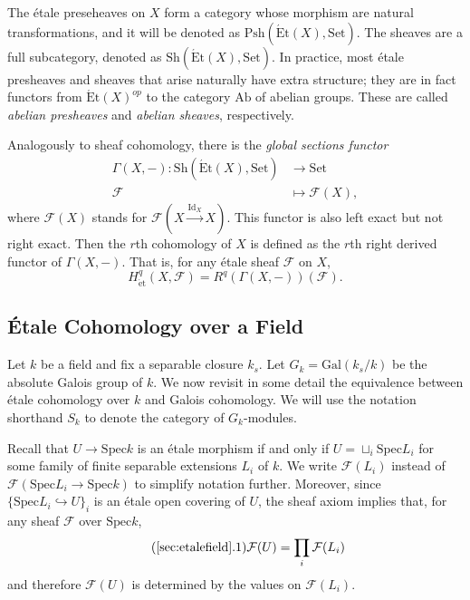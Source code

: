 \documentclass{article}
\newcommand{\Spec}{\mathrm{Spec}}
\newcommand{\Gal}{\mathrm{Gal}}
\newcommand{\Ab}{\mathrm{Ab}}
\newcommand{\Set}{\mathrm{Set}}
\newcommand{\Et}{\acute{\mathrm{E}}\mathrm{t}}
\newcommand{\et}{\acute{\mathrm{e}}\mathrm{t}}
\newcommand{\Psh}{\mathrm{Psh}}
\newcommand{\Sh}{\mathrm{Sh}}
\newcommand{\Id}{\mathrm{Id}}
\theoremstyle{plain}
\theoremstyle{definition}
\begin{document}
    The \'{e}tale preseheaves on $X$ form a category whose morphism are natural transformations, and it will be denoted as $\Psh(\Et(X),\Set)$. The sheaves are a full subcategory, denoted as $\Sh(\Et(X),\Set)$. In practice, most \'{e}tale presheaves and sheaves that arise naturally have extra structure; they are in fact functors from $\Et(X)^{op}$ to the category $\Ab$ of abelian groups. These are called \textit{abelian presheaves} and \textit{abelian sheaves}, respectively.    
    
    Analogously to sheaf cohomology, there is the \textit{global sections functor}
    \begin{align*}
        \Gamma(X,-):\mathrm{Sh}(\Et(X),\Set)&\longrightarrow\Set\\
        \mathcal{F}&\longmapsto\mathcal{F}(X),
    \end{align*}
    where $\mathcal{F}(X)$ stands for $\mathcal{F}(X\xrightarrow{\Id_X}X)$. This functor is also left exact but not right exact. Then the $r$th cohomology of $X$ is defined as the $r$th right derived functor of $\Gamma(X,-)$. That is, for any \'{e}tale sheaf $\mathcal{F}$ on $X$, 
    $$H^q_{\et}(X,\mathcal{F})=R^q(\Gamma(X,-))(\mathcal{F}).$$  


    \subsection{\'{E}tale Cohomology over a Field}\label{sec:etalefield}
    Let $k$ be a field and fix a separable closure $k_s$. Let $G_k=\Gal(k_s/k)$ be the absolute Galois group of $k$. We now revisit in some detail the equivalence between \'{e}tale cohomology over $k$ and Galois cohomology. We will use the notation shorthand $S_k$ to denote the category of $G_k$-modules.

    Recall that $U\to\Spec k$ is an \'{e}tale morphism if and only if $U=\sqcup_i \Spec L_i$ for some family of finite separable extensions $L_i$ of $k$. We write $\mathcal{F}(L_i)$ instead of $\mathcal{F}(\Spec L_i\to\Spec k)$ to simplify notation further. Moreover, since $\{\Spec L_i\hookrightarrow U\}_i$ is an \'{e}tale open covering of $U$, the sheaf axiom implies that, for any sheaf $\mathcal{F}$ over $\Spec k$, 
    \begin{equation}\label{eqn:speck}\tag{\ref{sec:etalefield}.1}
        \mathcal{F}(U)=\prod_i\mathcal{F}(L_i)
    \end{equation}
    and therefore $\mathcal{F}(U)$ is determined by the values on $\mathcal{F}(L_i)$. 
    
\end{document}
